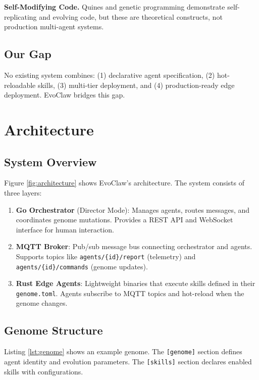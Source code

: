 \documentclass{article}
\begin{document}
\textbf{Self-Modifying Code.} Quines \cite{quine} and genetic programming \cite{gp} demonstrate self-replicating and evolving code, but these are theoretical constructs, not production multi-agent systems.

\subsection{Our Gap}

No existing system combines: (1) declarative agent specification, (2) hot-reloadable skills, (3) multi-tier deployment, and (4) production-ready edge deployment. EvoClaw bridges this gap.

\section{Architecture}\label{sec:architecture}

\subsection{System Overview}

Figure \ref{fig:architecture} shows EvoClaw's architecture. The system consists of three layers:

\begin{enumerate}
    \item \textbf{Go Orchestrator} (Director Mode): Manages agents, routes messages, and coordinates genome mutations. Provides a REST API and WebSocket interface for human interaction.
    
    \item \textbf{MQTT Broker}: Pub/sub message bus connecting orchestrator and agents. Supports topics like \texttt{agents/\{id\}/report} (telemetry) and \texttt{agents/\{id\}/commands} (genome updates).
    
    \item \textbf{Rust Edge Agents}: Lightweight binaries that execute skills defined in their \texttt{genome.toml}. Agents subscribe to MQTT topics and hot-reload when the genome changes.
\end{enumerate}

\subsection{Genome Structure}

Listing \ref{lst:genome} shows an example genome. The \texttt{[genome]} section defines agent identity and evolution parameters. The \texttt{[skills]} section declares enabled skills with configurations.
\end{document}
